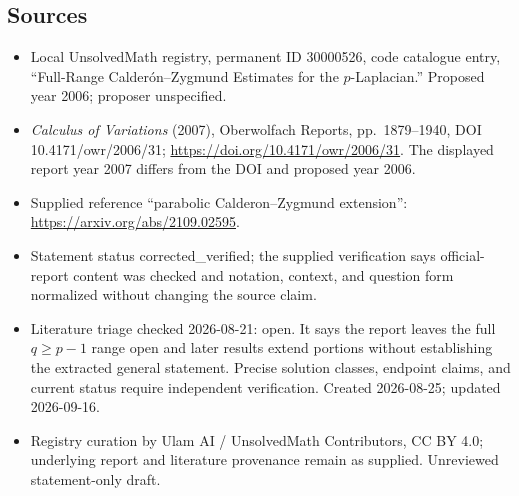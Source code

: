 \documentclass[11pt]{article}
\begin{document}
\subsection{Sources}
\begin{itemize}
\item Local UnsolvedMath registry, permanent ID 30000526, code catalogue entry, ``Full-Range Calder\'on--Zygmund Estimates for the $p$-Laplacian.'' Proposed year 2006; proposer unspecified.
\item \emph{Calculus of Variations} (2007), Oberwolfach Reports, pp.\ 1879--1940, DOI 10.4171/owr/2006/31; \url{https://doi.org/10.4171/owr/2006/31}. The displayed report year 2007 differs from the DOI and proposed year 2006.
\item Supplied reference ``parabolic Calderon--Zygmund extension'': \url{https://arxiv.org/abs/2109.02595}.
\item Statement status corrected\_verified; the supplied verification says official-report content was checked and notation, context, and question form normalized without changing the source claim.
\item Literature triage checked 2026-08-21: open. It says the report leaves the full $q\ge p-1$ range open and later results extend portions without establishing the extracted general statement. Precise solution classes, endpoint claims, and current status require independent verification. Created 2026-08-25; updated 2026-09-16.
\item Registry curation by Ulam AI / UnsolvedMath Contributors, CC BY 4.0; underlying report and literature provenance remain as supplied. Unreviewed statement-only draft.
\end{itemize}
\end{document}
